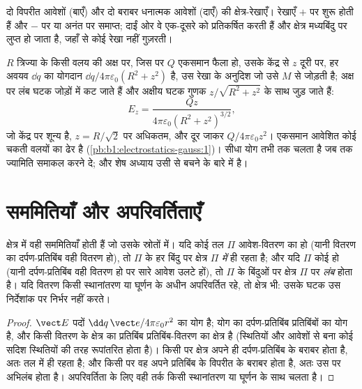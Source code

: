 \begin{omfigure}
{\small दो विपरीत आवेशों (बाएँ) और दो बराबर धनात्मक आवेशों (दाएँ) की
क्षेत्र-रेखाएँ। रेखाएँ $+$ पर शुरू होती हैं और $-$ पर या अनंत पर समाप्त;
दाईं ओर वे एक-दूसरे को प्रतिकर्षित करती हैं और क्षेत्र मध्यबिंदु पर लुप्त
हो जाता है, जहाँ से कोई रेखा नहीं गुज़रती।}
\end{omfigure}

\begin{example}[वलय और खंड, सीधे योग से]\label{ex:b1:electrostatics-gauss:ring}
$R$ त्रिज्या के किसी वलय की अक्ष पर, जिस पर $Q$ एकसमान फैला हो, उसके केंद्र
से $z$ दूरी पर, हर अवयव $\dd q$ का योगदान $\dd q/4\pi\varepsilon_0(R^2 +
z^2)$ है, उस रेखा के अनुदिश जो उसे $M$ से जोड़ती है; अक्ष पर लंब घटक जोड़ों में कट जाते हैं और अक्षीय
घटक गुणक
$z/\sqrt{R^2 + z^2}$ के साथ जुड़ जाते हैं:
\[
E_z = \frac{Qz}{4\pi\varepsilon_0(R^2 + z^2)^{3/2}} ,
\]
जो केंद्र पर शून्य है, $z = R/\sqrt2$ पर अधिकतम, और दूर जाकर $Q/4\pi\varepsilon_0z^2$।
एकसमान आवेशित कोई चकती वलयों का ढेर है (\cref{pb:b1:electrostatics-gauss:1})।
सीधा योग तभी तक चलता है जब तक ज्यामिति समाकल करने दे; और शेष अध्याय उसी से
बचने के बारे में है।
\end{example}

\section{सममितियाँ और अपरिवर्तिताएँ}

\begin{proposition}[सममिति का सिद्धांत]\label{prop:b1:electrostatics-gauss:symmetry}
क्षेत्र में वही सममितियाँ होती हैं जो उसके स्रोतों में। यदि कोई तल $\Pi$
आवेश-वितरण का \emph{} हो (यानी वितरण का दर्पण-प्रतिबिंब वही
वितरण हो), तो $\Pi$ के हर बिंदु पर क्षेत्र $\Pi$ \emph{में} ही रहता है; और
यदि $\Pi$ कोई \emph{} हो (यानी दर्पण-प्रतिबिंब वही वितरण हो
पर सारे आवेश उलटे हों), तो $\Pi$ के बिंदुओं पर क्षेत्र $\Pi$ पर
\emph{लंब} होता है। यदि वितरण किसी स्थानांतरण या घूर्णन के अधीन अपरिवर्तित
रहे, तो क्षेत्र भी: उसके घटक उस निर्देशांक पर निर्भर नहीं करते।
\end{proposition}

\begin{proof}
$\vect E$ पदों $\dd q\,\vect e/4\pi\varepsilon_0r^2$ का योग है; योग का
दर्पण-प्रतिबिंब प्रतिबिंबों का योग है, और किसी वितरण के क्षेत्र का
प्रतिबिंब प्रतिबिंब-वितरण का क्षेत्र है (स्थितियों और आवेशों से बना कोई
सदिश स्थितियों की तरह रूपांतरित होता है)। किसी  पर क्षेत्र अपने ही
दर्पण-प्रतिबिंब के बराबर होता है, अतः तल में ही रहता है; और किसी
 पर वह अपने प्रतिबिंब के विपरीत के बराबर होता है, अतः उस पर
अभिलंब होता है। अपरिवर्तिता के लिए वही तर्क किसी स्थानांतरण या घूर्णन के
साथ चलता है।
\end{proof}

